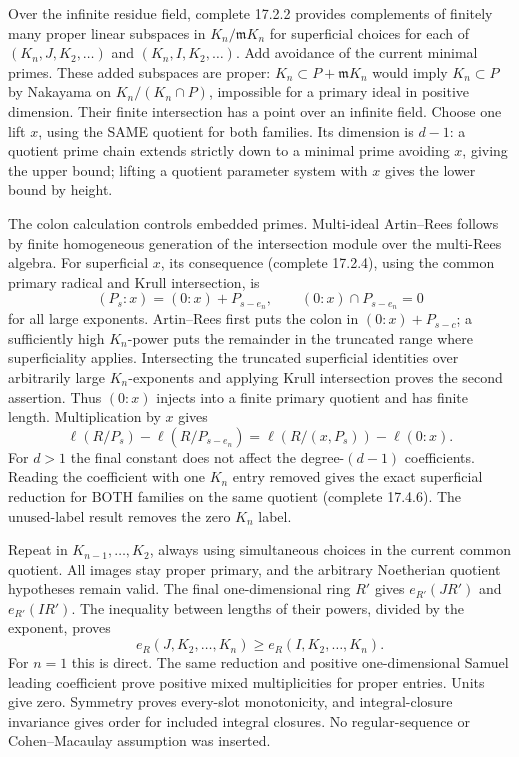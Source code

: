 \documentclass[11pt]{article}
\begin{document}
Over the infinite residue field, complete 17.2.2 provides complements of finitely many proper linear subspaces in \(K_n/\mathfrak mK_n\) for superficial choices for each of \((K_n,J,K_2,\ldots)\) and \((K_n,I,K_2,\ldots)\). Add avoidance of the current minimal primes. These added subspaces are proper: \(K_n\subset P+\mathfrak mK_n\) would imply \(K_n\subset P\) by Nakayama on \(K_n/(K_n\cap P)\), impossible for a primary ideal in positive dimension. Their finite intersection has a point over an infinite field. Choose one lift \(x\), using the SAME quotient for both families. Its dimension is \(d-1\): a quotient prime chain extends strictly down to a minimal prime avoiding \(x\), giving the upper bound; lifting a quotient parameter system with \(x\) gives the lower bound by height.

The colon calculation controls embedded primes. Multi-ideal Artin--Rees follows by finite homogeneous generation of the intersection module over the multi-Rees algebra. For superficial \(x\), its consequence (complete 17.2.4), using the common primary radical and Krull intersection, is
\[
(P_s:x)=(0:x)+P_{s-e_n},\qquad (0:x)\cap P_{s-e_n}=0
\]
for all large exponents. Artin--Rees first puts the colon in \((0:x)+P_{s-c}\); a sufficiently high \(K_n\)-power puts the remainder in the truncated range where superficiality applies. Intersecting the truncated superficial identities over arbitrarily large \(K_n\)-exponents and applying Krull intersection proves the second assertion. Thus \((0:x)\) injects into a finite primary quotient and has finite length. Multiplication by \(x\) gives
\[
\ell(R/P_s)-\ell(R/P_{s-e_n})
=\ell(R/(x,P_s))-\ell(0:x).
\]
For \(d>1\) the final constant does not affect the degree-\((d-1)\) coefficients. Reading the coefficient with one \(K_n\) entry removed gives the exact superficial reduction for BOTH families on the same quotient (complete 17.4.6). The unused-label result removes the zero \(K_n\) label.

Repeat in \(K_{n-1},\ldots,K_2\), always using simultaneous choices in the current common quotient. All images stay proper primary, and the arbitrary Noetherian quotient hypotheses remain valid. The final one-dimensional ring \(R'\) gives \(e_{R'}(JR')\) and \(e_{R'}(IR')\). The inequality between lengths of their powers, divided by the exponent, proves
\[
e_R(J,K_2,\ldots,K_n)\ge e_R(I,K_2,\ldots,K_n).
\]
For \(n=1\) this is direct. The same reduction and positive one-dimensional Samuel leading coefficient prove positive mixed multiplicities for proper entries. Units give zero. Symmetry proves every-slot monotonicity, and integral-closure invariance gives order for included integral closures. No regular-sequence or Cohen--Macaulay assumption was inserted.
\end{document}
